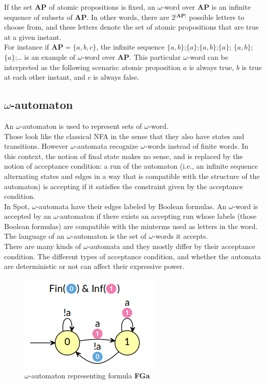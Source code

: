 If the set \textbf{AP} of atomic propositions is fixed, an $\omega$-word over \textbf{AP} is an infinite
sequence of subsets of \textbf{AP}. In other words, there are 2$^{|\textbf{AP}|}$ possible letters to
choose from, and these letters denote the set of atomic propositions that are true at a given instant.\\

For instance if \textbf{AP}$=\{a,b,c\}$, the infinite sequence $\{a,b\}$;$\{a\}$;$\{a,b\}$;$\{a\}$;
$\{a,b\}$;$\{a\}$;… is an example of $\omega$-word over \textbf{AP}. This particular $\omega$-word can be
interpreted as the following scenario: atomic proposition $a$ is always true, $b$ is true at each other
instant, and $c$ is always false.

\subsection{$\omega$-automaton}
An $\omega$-automaton is used to represent sets of $\omega$-word.\\

Those look like the classical NFA in the sense that they also have states and transitions. However
$\omega$-automata recognize $\omega$-words instead of finite words. In this context, the notion of final
state makes no sense, and is replaced by the notion of acceptance condition: a run of the automaton
(i.e., an infinite sequence alternating states and edges in a way that is compatible with the structure of
the automaton) is accepting if it satisfies the constraint given by the acceptance condition.\\

In Spot, $\omega$-automata have their edges labeled by Boolean formulas. An $\omega$-word is accepted by an
$\omega$-automaton if there exists an accepting run whose labels (those Boolean formulas) are compatible
with the minterms \cite{11} used as letters in the word.\\

The language of an $\omega$-automaton is the set of $\omega$-words it accepts.\\

There are many kinds of $\omega$-automata and they mostly differ by their acceptance condition. The
different types of acceptance condition, and whether the automata are deterministic or not can affect their
expressive power.

\begin{figure}[H]
 \centering
 \includegraphics[scale=0.8]{img/omega_aut.png}
 \caption{$\omega$-automaton representing formula \textbf{FGa}}
 \label{fig:omega_aut}
\end{figure}

